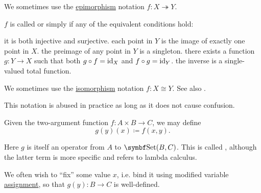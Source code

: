 \begin{definition}
\begin{DefEnum}
    We sometimes use the \hyperref[def:morphism_invertibility/epimorphism]{epimorphism} notation \( f: X \twoheadrightarrow Y \).

     \( f \) is called  or simply  if any of the equivalent conditions hold:
    \begin{DefEnum}
       it is both injective and surjective.
       each point in \( Y \) is the image of exactly one point in \( X \).
       the preimage of any point in \( Y \) is a singleton.
       there exists a function \( g: Y \to X \) such that both \( g \circ f = \operatorname{id}_X \) and \( f \circ g = \operatorname{id}_Y \).
       the inverse is a single-valued total function.
    \end{DefEnum}

    We sometimes use the \hyperref[def:morphism_invertibility/isomorphism]{isomorphism} notation \( f: X \cong Y \). See also .
  \end{DefEnum}
\end{definition}

\begin{definition}\label{def:currying}
  This notation is abused in practice as long as it does not cause confusion.

  Given the two-argument function \( f: A \times B \to C \), we may define
  \begin{equation*}
    g(y)(x) \coloneqq f(x, y).
  \end{equation*}

  Here \( g \) is itself an operator from \( A \) to \( \Cat{Set}(B, C) \). This is called , although the latter term is more specific and refers to lambda calculus.

  We often wish to \enquote{fix} some value \( x \), i.e. bind it using modified variable \hyperref[def:first_order_variable_assignment]{assignment}, so that \( g(y): B \to C \) is well-defined.
\end{definition}

